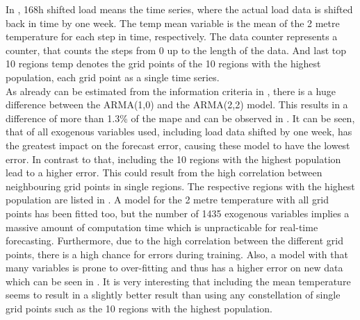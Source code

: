 In , 168h shifted load means the time series, where the actual load data is shifted back in time by one week. The temp mean variable is the mean of the 2 metre temperature for each step in time, respectively. The data counter represents a counter, that counts the steps from 0 up to the length of the data. And last top 10 regions temp denotes the grid points of the 10 regions with the highest population, each grid point as a single time series.\\

As already can be estimated from the information criteria in , there is a huge difference between the ARMA(1,0) and the ARMA(2,2) model. This results in a difference of more than 1.3\% of the \gls{mape} and can be observed in . It can be seen, that of all exogenous variables used, including load data shifted by one week, has the greatest impact on the forecast error, causing these model to have the lowest error. In contrast to that, including the 10 regions with the highest population lead to a higher error. This could result from the high correlation between neighbouring grid points in single regions. The respective regions with the highest population are listed in . A model for the 2 metre temperature with all grid points has been fitted too, but the number of 1435 exogenous variables implies a massive amount of computation time which is unpracticable for real-time forecasting. Furthermore, due to the high correlation between the different grid points, there is a high chance for errors during training. Also, a model with that many variables is prone to over-fitting and thus has a higher error on new data which can be seen in . It is very interesting that including the mean temperature seems to result in a slightly better result than using any constellation of single grid points such as \eg the 10 regions with the highest population.\\

